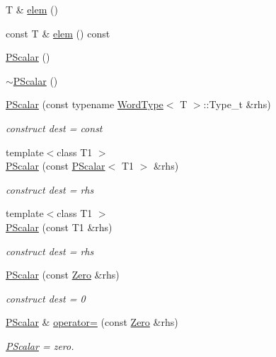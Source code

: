 \begin{DoxyCompactItemize}
T \& \mbox{\hyperlink{classENSEM_1_1PScalar_aac65f47beae4fa376f101587344c1589}{elem}} ()
\item 
const T \& \mbox{\hyperlink{classENSEM_1_1PScalar_ac20d84af6de415de7ad63292ad278542}{elem}} () const
\item 
\mbox{\hyperlink{classENSEM_1_1PScalar_a0f70e3ea4cc0d0f1753a2ed87ecf2e04}{P\+Scalar}} ()
\item 
\mbox{\hyperlink{classENSEM_1_1PScalar_a136d4a70f16eadecdf840f4e9d4b1b7c}{$\sim$\+P\+Scalar}} ()
\item 
\mbox{\hyperlink{classENSEM_1_1PScalar_aeb51f7fd0a7c5d9b7465ceabdb9311f8}{P\+Scalar}} (const typename \mbox{\hyperlink{structENSEM_1_1WordType}{Word\+Type}}$<$ T $>$\+::Type\+\_\+t \&rhs)
\begin{DoxyCompactList}\small\item\em construct dest = const \end{DoxyCompactList}\item 
{\footnotesize template$<$class T1 $>$ }\\\mbox{\hyperlink{classENSEM_1_1PScalar_a5dad766fb1a59a9e23d03b31f22916bb}{P\+Scalar}} (const \mbox{\hyperlink{classENSEM_1_1PScalar}{P\+Scalar}}$<$ T1 $>$ \&rhs)
\begin{DoxyCompactList}\small\item\em construct dest = rhs \end{DoxyCompactList}\item 
{\footnotesize template$<$class T1 $>$ }\\\mbox{\hyperlink{classENSEM_1_1PScalar_a99cdd295d67d2d32aa481a4a8d9dcc1b}{P\+Scalar}} (const T1 \&rhs)
\begin{DoxyCompactList}\small\item\em construct dest = rhs \end{DoxyCompactList}\item 
\mbox{\hyperlink{classENSEM_1_1PScalar_a9d7f56a0caeb05ee423b451d2f3aae3b}{P\+Scalar}} (const \mbox{\hyperlink{structENSEM_1_1Zero}{Zero}} \&rhs)
\begin{DoxyCompactList}\small\item\em construct dest = 0 \end{DoxyCompactList}\item 
\mbox{\hyperlink{classENSEM_1_1PScalar}{P\+Scalar}} \& \mbox{\hyperlink{classENSEM_1_1PScalar_a4357d579e24371f6384da9008f4512b3}{operator=}} (const \mbox{\hyperlink{structENSEM_1_1Zero}{Zero}} \&rhs)
\begin{DoxyCompactList}\small\item\em \mbox{\hyperlink{classENSEM_1_1PScalar}{P\+Scalar}} = zero. \end{DoxyCompactList}\item 

\end{DoxyCompactItemize}
